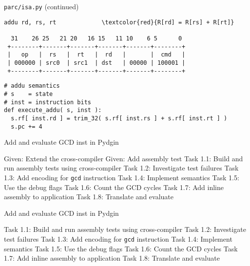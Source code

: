 
\begin{frame}[fragile]{\texttt{parc/isa.py} (continued)}

\begin{Verbatim}[commandchars=\\\{\}]
  addu rd, rs, rt             \textcolor{red}{R[rd] = R[rs] + R[rt]}

  31    26 25   21 20   16 15   11 10    6 5      0
 +--------+-------+-------+-------+-------+--------+
 |   op   |  rs   |  rt   |  rd   |       |  cmd   |
 | 000000 | src0  | src1  | dst   | 00000 | 100001 |
 +--------+-------+-------+-------+-------+--------+

\end{Verbatim}

\vspace{-20pt}

\begin{lstlisting}[numbers=none]
# addu semantics
# s    = state
# inst = instruction bits
def execute_addu( s, inst ):
  s.rf[ inst.rd ] = trim_32( s.rf[ inst.rs ] + s.rf[ inst.rt ] )
  s.pc += 4
\end{lstlisting}
\end{frame}


\begin{frame}{ Add and evaluate GCD inst in Pydgin}
\begin{cbxlist}
  \1 Given: Extend the cross-compiler
  \1 Given: Add assembly test
  \1 Task 1.1: Build and run assembly tests using cross-compiler
  \1 Task 1.2: Investigate test failures
  \1 Task 1.3: Add encoding for \texttt{gcd} instruction
  \1 Task 1.4: Implement semantics
  \1 Task 1.5: Use the debug flags
  \1 Task 1.6: Count the GCD cycles
  \1 Task 1.7: Add inline assembly to application
  \1 Task 1.8: Translate and evaluate
\end{cbxlist}
\end{frame}

\begin{frame}{ Add and evaluate GCD inst in Pydgin}
\begin{cbxlist}
  \1 
  \1 
  \1 Task 1.1: Build and run assembly tests using cross-compiler
  \1 Task 1.2: Investigate test failures
  \1 Task 1.3: Add encoding for \texttt{gcd} instruction
  \1 Task 1.4: Implement semantics
  \1 Task 1.5: Use the debug flags
  \1 Task 1.6: Count the GCD cycles
  \1 Task 1.7: Add inline assembly to application
  \1 Task 1.8: Translate and evaluate
\end{cbxlist}
\end{frame}

